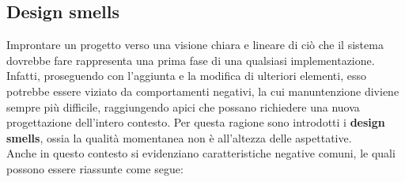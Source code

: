 \documentclass{article}
\begin{document}
\subsection*{Design smells}
\large
Improntare un progetto verso una visione chiara e lineare di ciò che il sistema dovrebbe fare rappresenta una prima fase di una qualsiasi implementazione. Infatti, proseguendo con l'aggiunta e la modifica di ulteriori elementi, esso potrebbe essere viziato da comportamenti negativi, la cui manuntenzione diviene sempre più difficile, raggiungendo apici che possano richiedere una nuova progettazione dell'intero contesto. Per questa ragione sono introdotti i \textbf{design smells}, ossia la qualità momentanea non è all'altezza delle aspettative.\vspace*{14pt}\\
Anche in questo contesto si evidenziano caratteristiche negative comuni, le quali possono essere riassunte come segue:
\end{document}
